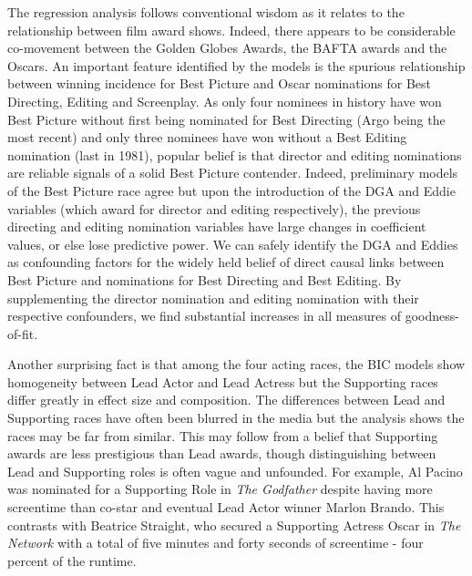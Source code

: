 \documentclass[jou,apacite]{apa6}
\begin{document}
The regression analysis follows conventional wisdom as it relates to the relationship between film award shows. Indeed, there appears to be considerable co-movement between the Golden Globes Awards, the BAFTA awards and the Oscars. An important feature identified by the models is the spurious relationship between winning incidence for Best Picture and Oscar nominations for Best Directing, Editing and Screenplay. As only four nominees in history have won Best Picture without first being nominated for Best Directing (Argo being the most recent) and only three nominees have won without a Best Editing nomination (last in 1981), popular belief is that director and editing nominations are reliable signals of a solid Best Picture contender. Indeed, preliminary models of the Best Picture race agree but upon the introduction of the DGA and Eddie variables (which award for director and editing respectively), the previous directing and editing nomination variables have large changes in coefficient values, or else lose predictive power. We can safely identify the DGA and Eddies as confounding factors for the widely held belief of direct causal links between Best Picture and nominations for Best Directing and Best Editing. By supplementing the director nomination and editing nomination with their respective confounders, we find substantial increases in all measures of goodness-of-fit.

Another surprising fact is that among the four acting races, the BIC models show homogeneity between Lead Actor and Lead Actress but the Supporting races differ greatly in effect size and composition. The differences between Lead and Supporting races have often been blurred in the media but the analysis shows the races may be far from similar. This may follow from a belief that Supporting awards are less prestigious than Lead awards, though distinguishing between Lead and Supporting roles is often vague and unfounded. For example, Al Pacino was nominated for a Supporting Role in \emph{The Godfather} despite having more screentime than co-star and eventual Lead Actor winner Marlon Brando. This contrasts with Beatrice Straight, who secured a Supporting Actress Oscar in \emph{The Network} with a total of five minutes and forty seconds of screentime - four percent of the runtime.
\end{document}
